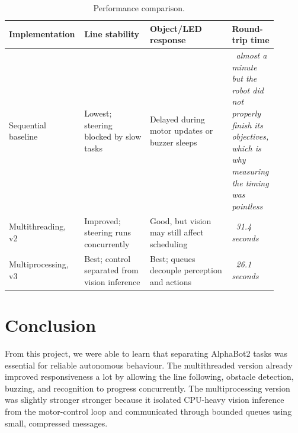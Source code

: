 \documentclass[10pt,a4paper]{article}
\begin{document}
\begin{table}[htbp]
\centering
\begin{tabular}{L{0.22\linewidth}L{0.24\linewidth}L{0.30\linewidth}L{0.14\linewidth}}
\toprule
Implementation & Line stability & Object/LED response & Round-trip time \\
\midrule
Sequential baseline & Lowest; steering blocked by slow tasks & Delayed during motor updates or buzzer sleeps & \textit{~almost a minute but the robot did not properly finish its objectives, which is why measuring the timing was pointless} \\
Multithreading, v2 & Improved; steering runs concurrently & Good, but vision may still affect scheduling & \textit{~31.4 seconds} \\
Multiprocessing, v3 & Best; control separated from vision inference & Best; queues decouple perception and actions & \textit{~26.1 seconds} \\
\bottomrule
\end{tabular}
\caption{Performance comparison.}
\end{table}

\section{Conclusion}
From this project, we were able to learn that separating AlphaBot2 tasks was essential for reliable autonomous behaviour. The multithreaded version already improved responsiveness a lot by allowing the line following, obstacle detection, buzzing, and recognition to progress concurrently. The multiprocessing version was slightly stronger stronger because it isolated CPU-heavy vision inference from the motor-control loop and communicated through bounded queues using small, compressed messages. 
\end{document}
